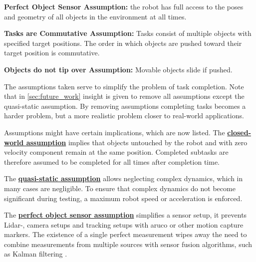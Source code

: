 \begin{assumption*}%
\label{assumption:perfect_object_sensor}
\textbf{Perfect Object Sensor Assumption:} the robot has full access to the poses and geometry of all objects in the environment at all times.
\end{assumption*}\bs

\begin{assumption*}%
\label{assumption:order_does_not_matter}
\textbf{Tasks are Commutative Assumption:} Tasks consist of multiple objects with specified target positions. The order in which objects are pushed toward their target position is commutative.
\end{assumption*}\bs

\begin{assumption*}%
\label{assumption:no_tipping}
\textbf{Objects do not tip over Assumption:} Movable objects slide if pushed.
\end{assumption*}\bs

The assumptions taken serve to simplify the problem of task completion. Note that in \cref{sec:future_work} insight is given to remove all assumptions except the quasi-static assumption. By removing assumptions completing tasks becomes a harder problem, but a more realistic problem closer to real-world applications.\bs

Assumptions might have certain implications, which are now listed. The \hyperref[assumption:closed_world]{\textbf{closed-world assumption}} implies that objects untouched by the robot and with zero velocity component remain at the same position. Completed subtasks are therefore assumed to be completed for all times after completion time.\bs

The \hyperref[assumption:quasi_static]{\textbf{quasi-static assumption}} allows neglecting complex dynamics, which in many cases are negligible. To ensure that complex dynamics do not become significant during testing, a maximum robot speed or acceleration is enforced.\bs
{}

The \hyperref[assumption:perfect_object_sensor]{\textbf{perfect object sensor assumption}} simplifies a sensor setup, it prevents Lidar-, camera setups and tracking setups with aruco or other motion capture markers. The existence of a single perfect measurement wipes away the need to combine measurements from multiple sources with sensor fusion algorithms, such as Kalman filtering \cite{verhaegen_filtering_2007}.\bs

